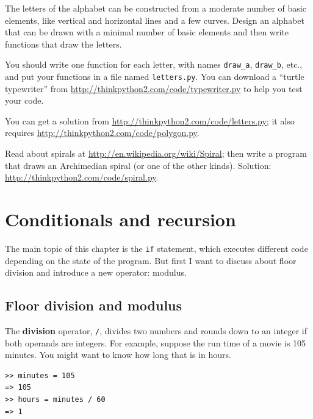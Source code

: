 \documentclass[10pt]{book}
\begin{document}
\begin{exercise}

The letters of the alphabet can be constructed from a moderate number
of basic elements, like vertical and horizontal lines and a few
curves.  Design an alphabet that can be drawn with a minimal
number of basic elements and then write functions that draw the letters.

You should write one function for each letter, with names
\verb"draw_a", \verb"draw_b", etc., and put your functions
in a file named {\tt letters.py}.  You can download a
``turtle typewriter'' from \url{http://thinkpython2.com/code/typewriter.py}
to help you test your code.

You can get a solution from \url{http://thinkpython2.com/code/letters.py};
it also requires
\url{http://thinkpython2.com/code/polygon.py}.

\end{exercise}

\begin{exercise}

Read about spirals at \url{http://en.wikipedia.org/wiki/Spiral}; then
write a program that draws an Archimedian spiral (or one of the other
kinds).  Solution: \url{http://thinkpython2.com/code/spiral.py}.

\end{exercise}


\chapter{Conditionals and recursion}

The main topic of this chapter is the {\tt if} statement, which
executes different code depending on the state of the program.
But first I want to discuss about floor division and introduce
a new operator: modulus.


\section{Floor division and modulus}

The {\bf division} operator, \verb"/", divides
two numbers and rounds down to an integer if both operands are integers.
For example, suppose the
run time of a movie is 105 minutes.  You might want to know how
long that is in hours.

\begin{verbatim}
>> minutes = 105
=> 105
>> hours = minutes / 60
=> 1
\end{verbatim}
\end{document}
